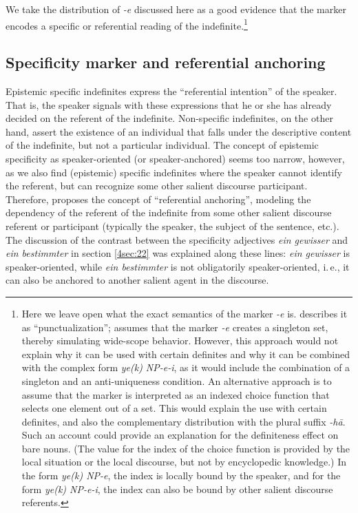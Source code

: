 \documentclass[output=paper]{langsci/langscibook}
\begin{document}
We take the distribution of {\emph{-e}} discussed here as a good evidence that the marker encodes a specific or referential reading of the indefinite.\footnote{{Here we leave open what the exact semantics of the marker {\emph{-e}} is. \cite[][176]{hincha:61} describes it as ``punctualization''; \cite{jasbi:20b} assumes that the marker {\emph{-e}} creates a singleton set, thereby simulating wide-scope behavior. However, this approach would not explain why it can be used with certain definites and why it can be combined with the complex form {\emph{ye(k) NP-e-i}}, as it would include the combination of a singleton and an anti-uniqueness condition. An alternative approach is to assume that the marker is interpreted as an indexed choice function \citep{egli:vonheus:95,winter:97} that selects one element out of a set. This would explain the use with certain definites, and also the complementary distribution with the plural suffix {\emph{-hā}}. Such an account could provide an explanation for the definiteness effect on bare nouns. (The value for the index of the choice function is provided by the local situation or the local discourse, but not by encyclopedic knowledge.) In the form {\emph{ye(k) NP-e}}, the index is locally bound by the speaker, and for the form {\emph{ye(k) NP-e-i}}, the index can also be bound by other salient discourse referents.}}


\subsection{Specificity marker and referential anchoring}\label{4sec:43}

{
Epistemic specific indefinites express the ``referential intention'' of the speaker. That is, the speaker signals with these expressions that he or she has already decided on the referent of the indefinite. Non-specific indefinites, on the other hand, assert the existence of an individual that falls under the descriptive content of the indefinite, but not a particular individual. The concept of epistemic specificity as speaker-oriented (or speaker-anchored) seems too narrow, however, as we also find (epistemic) specific indefinites where the speaker cannot identify the referent, but can recognize some other salient discourse participant. Therefore, \cite{vonheus:02url,vonheus:19} proposes the concept of ``referential anchoring'', modeling the dependency of the referent of the indefinite from some other salient discourse referent or participant (typically the speaker, the subject of the sentence, etc.). The discussion of the contrast between the specificity adjectives {\emph{ein gewisser}} and {\emph{ein bestimmter}} in section \ref{4sec:22} was explained along these lines: {\emph{ein gewisser}} is speaker-oriented, while {\emph{ein bestimmter}} is not obligatorily speaker-oriented, i.\,e., it can also be anchored to another salient agent in the discourse.
}
\end{document}
